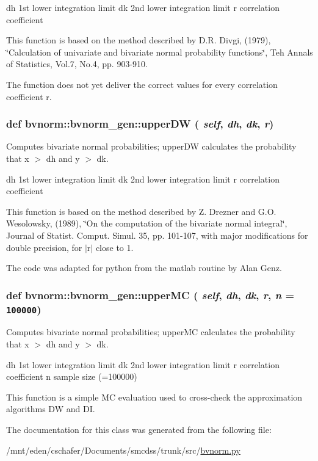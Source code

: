 dh 1st lower integration limit dk 2nd lower integration limit r correlation coefficient

This function is based on the method described by D.R. Divgi, (1979), \char`\"{}Calculation of univariate and bivariate normal probability functions\char`\"{}, Teh Annals of Statistics, Vol.7, No.4, pp. 903-910.

The function does not yet deliver the correct values for every correlation coefficient r. \hypertarget{classbvnorm_1_1bvnorm__gen_bd58b5d4090258a364bcb50619b24b08}{
\subsubsection[{upperDW}]{\setlength{\rightskip}{0pt plus 5cm}def bvnorm::bvnorm\_\-gen::upperDW ( {\em self}, \/   {\em dh}, \/   {\em dk}, \/   {\em r})}}
\label{classbvnorm_1_1bvnorm__gen_bd58b5d4090258a364bcb50619b24b08}


Computes bivariate normal probabilities; upperDW calculates the probability that x $>$ dh and y $>$ dk. 

dh 1st lower integration limit dk 2nd lower integration limit r correlation coefficient

This function is based on the method described by Z. Drezner and G.O. Wesolowsky, (1989), \char`\"{}On the computation of the bivariate normal integral\char`\"{}, Journal of Statist. Comput. Simul. 35, pp. 101-107, with major modifications for double precision, for $|$r$|$ close to 1.

The code was adapted for python from the matlab routine by Alan Genz. \hypertarget{classbvnorm_1_1bvnorm__gen_65e19caa62c397d0e2de0e4d66a57d26}{
\subsubsection[{upperMC}]{\setlength{\rightskip}{0pt plus 5cm}def bvnorm::bvnorm\_\-gen::upperMC ( {\em self}, \/   {\em dh}, \/   {\em dk}, \/   {\em r}, \/   {\em n} = {\tt 100000})}}
\label{classbvnorm_1_1bvnorm__gen_65e19caa62c397d0e2de0e4d66a57d26}


Computes bivariate normal probabilities; upperMC calculates the probability that x $>$ dh and y $>$ dk. 

dh 1st lower integration limit dk 2nd lower integration limit r correlation coefficient n sample size (=100000)

This function is a simple MC evaluation used to cross-check the approximation algorithms DW and DI. 

The documentation for this class was generated from the following file:\begin{CompactItemize}
\item 
/mnt/eden/cschafer/Documents/smcdss/trunk/src/\hyperlink{bvnorm_8py}{bvnorm.py}\end{CompactItemize}

